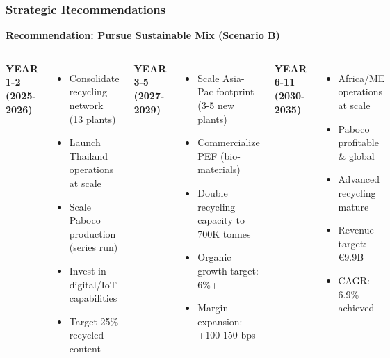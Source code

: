 \documentclass[aspectratio=169,12pt,xcolor=dvipsnames]{beamer}
\newcommand{\highlight}[1]{{\color{alpla_blue}\textbf{#1}}}
\begin{document}

\begin{frame}
  \frametitle{Strategic Recommendations}

  \textbf{\textbf{\Large Recommendation: Pursue Sustainable Mix (Scenario B)}}

  \vspace{0.5cm}

  \begin{columns}[T]

    \textbf{\highlight{YEAR 1-2 (2025-2026)}}

    \small
    \begin{itemize}
      \item Consolidate recycling network (13 plants)
      \item Launch Thailand operations at scale
      \item Scale Paboco production (series run)
      \item Invest in digital/IoT capabilities
      \item Target 25\% recycled content
    \end{itemize}


    \textbf{\highlight{YEAR 3-5 (2027-2029)}}

    \small
    \begin{itemize}
      \item Scale Asia-Pac footprint (3-5 new plants)
      \item Commercialize PEF (bio-materials)
      \item Double recycling capacity to 700K tonnes
      \item Organic growth target: 6\%+
      \item Margin expansion: +100-150 bps
    \end{itemize}


    \textbf{\highlight{YEAR 6-11 (2030-2035)}}

    \small
    \begin{itemize}
      \item Africa/ME operations at scale
      \item Paboco profitable \& global
      \item Advanced recycling mature
      \item Revenue target: €9.9B
      \item CAGR: 6.9\% achieved
    \end{itemize}


\end{columns}
\end{frame}
\end{document}
